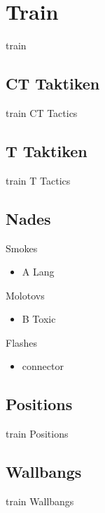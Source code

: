 \newpage




\chapter{Train}
\label{chap:train}
train

\section{CT Taktiken}
\label{sect:train_ct}
train CT Tactics

\section{T Taktiken}
\label{sect:train_t}
train T Tactics

\section{Nades}
\label{sect:train_nades}
Smokes
\begin{itemize}
\item A Lang
\end{itemize}

Molotovs
\begin{itemize}
\item B Toxic
\end{itemize}

Flashes
\begin{itemize}
\item connector
\end{itemize}

\section{Positions}
\label{sect:train_positions}
train Positions

\section{Wallbangs}
\label{sect:train_wallbangs}
train Wallbangs
